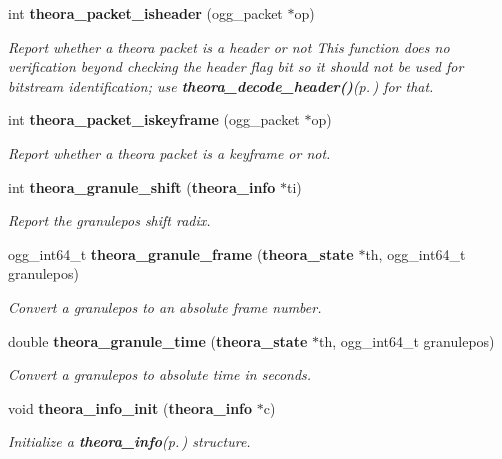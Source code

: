 \begin{CompactItemize}
int {\bf theora\_\-packet\_\-isheader} (ogg\_\-packet $\ast$op)
\begin{CompactList}\small\item\em Report whether a theora packet is a header or not This function does no verification beyond checking the header flag bit so it should not be used for bitstream identification; use {\bf theora\_\-decode\_\-header()}{\rm (p.\,\pageref{theora_8h_41a60c67649c41ae88278d777f89ee3f})} for that. \item\end{CompactList}\item 
int {\bf theora\_\-packet\_\-iskeyframe} (ogg\_\-packet $\ast$op)
\begin{CompactList}\small\item\em Report whether a theora packet is a keyframe or not. \item\end{CompactList}\item 
int {\bf theora\_\-granule\_\-shift} ({\bf theora\_\-info} $\ast$ti)
\begin{CompactList}\small\item\em Report the granulepos shift radix. \item\end{CompactList}\item 
ogg\_\-int64\_\-t {\bf theora\_\-granule\_\-frame} ({\bf theora\_\-state} $\ast$th, ogg\_\-int64\_\-t granulepos)
\begin{CompactList}\small\item\em Convert a granulepos to an absolute frame number. \item\end{CompactList}\item 
double {\bf theora\_\-granule\_\-time} ({\bf theora\_\-state} $\ast$th, ogg\_\-int64\_\-t granulepos)
\begin{CompactList}\small\item\em Convert a granulepos to absolute time in seconds. \item\end{CompactList}\item 
void {\bf theora\_\-info\_\-init} ({\bf theora\_\-info} $\ast$c)
\begin{CompactList}\small\item\em Initialize a {\bf theora\_\-info}{\rm (p.\,\pageref{structtheora__info})} structure. \item\end{CompactList}\item 

\end{CompactItemize}
